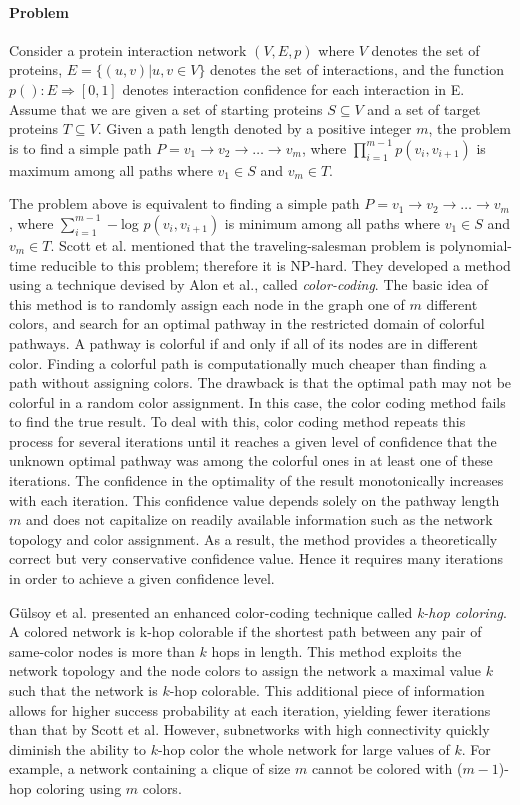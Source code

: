 \documentclass{ws-procs11x85}
\begin{document}
\paragraph{Problem} Consider a protein interaction network $(V, E, p)$ where
$V$ denotes the set of proteins, $E = \{(u, v) | u,v \in V\}$ denotes the set of
interactions, and the function $p(): E \Rightarrow [0, 1]$  denotes interaction
confidence for each interaction in E. Assume that we are given a set of starting
proteins $S \subseteq V$ and a set of target proteins $T \subseteq V$. Given a
path length denoted by a positive integer $m$, the problem is to find a simple
path $P = v_1 \rightarrow v_2 \rightarrow \ldots \rightarrow v_m$, where
$\prod_{i=1}^{m-1} p(v_i, v_{i+1})$ is maximum among all paths where $v_1 \in S$
and $v_m \in T$.

The problem above is equivalent to finding a simple path $P = v_1 \rightarrow
v_2 \rightarrow \ldots \rightarrow v_m$, where $\sum_{i=1}^{m-1} -$log $p(v_i,
v_{i+1})$ is minimum among all paths where $v_1 \in S$ and $v_m \in T$. Scott et
al.\cite{scott} mentioned that the traveling-salesman problem is polynomial-time
reducible to this problem; therefore it is NP-hard. They developed a method
using a technique devised by Alon et al.\cite{alon}, called
\textit{color-coding}. The basic idea of this method is to randomly assign each
node in the graph one of $m$ different colors, and search for an optimal
pathway in the restricted domain of colorful pathways. A pathway is colorful if
and only if all of its nodes are in different color. Finding a colorful path is
computationally much cheaper than finding a path without assigning colors. The
drawback is that the optimal path may not be colorful in a random color
assignment. In this case, the color coding method fails to find the true result.
To deal with this, color coding method repeats this process for several
iterations until it reaches a given level of confidence that the unknown
optimal pathway was among the colorful ones in at least one of these iterations.
The confidence in the optimality of the result monotonically increases with each
iteration. This confidence value depends solely on the pathway length $m$ and
does not capitalize on readily available information such as the network
topology and color assignment. As a result, the method provides a theoretically
correct but very conservative confidence value. Hence it requires many
iterations in order to achieve a given confidence level.

G{\"u}lsoy et al.\cite{gulsoy} presented an enhanced color-coding technique
called \textit{k-hop coloring}. A colored network is
k-hop colorable if the shortest path between any pair of same-color nodes is
more than $k$ hops in length. This method exploits the network topology and
the node colors to assign the network a maximal value $k$ such that the network
is $k$-hop colorable. This additional piece of information allows for higher
success probability at each iteration, yielding fewer iterations than that
by Scott et al. However, subnetworks with high connectivity quickly diminish
the ability to $k$-hop color the whole network for large values of $k$. For
example, a network containing a clique of size $m$ cannot be colored with
($m-1$)-hop coloring using $m$ colors\cite{gulsoy}.
\end{document}
